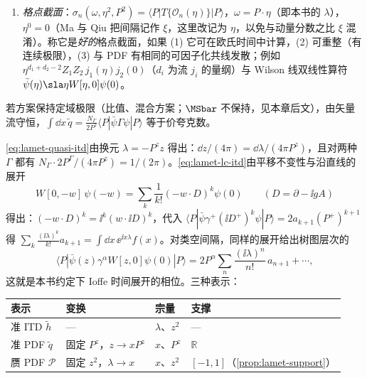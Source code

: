 \begin{definition}
\begin{enumerate}[label=(\roman*),leftmargin=2em,itemsep=1pt,topsep=2pt]
\begin{equation}\label{eq:lamet-lc-itd}
I(\lambda,\mu)=\frac{\langle P|\bar\psi(w)\gamma^+W[w,0]\psi(0)|P\rangle}{2P^+}=\int_{-1}^1\dd x\,\ee^{\ii x\lambda}f(x,\mu),
\end{equation}
其中 $w=(0^+,w^-,\mathbf 0_{\mathrm T})$，$\lambda=P^+w^-$。
\item \emph{格点截面}\cite{MaQiu2018}：$\sigma_n(\omega,\eta^2,P^2)=\langle P|T\{\mathcal O_n(\eta)\}|P\rangle$，$\omega=P\cdot\eta$（即本书的 $\lambda$），$\eta^0=0$（Ma 与 Qiu 把间隔记作 $\xi$，这里改记为 $\eta$，以免与动量分数之比 $\xi$ 混淆）。称它是\emph{好的}格点截面，如果 (1) 它可在欧氏时间中计算，(2) 可重整（有连续极限），(3) 与 PDF 有相同的可因子化共线发散；例如 $\eta^{d_1+d_2-2}Z_1Z_2\,j_1(\eta)j_2(0)$（$d_i$ 为流 $j_i$ 的量纲）与 Wilson 线双线性算符 $\bar\psi(\eta)\sla\eta W[\eta,0]\psi(0)$。
\end{enumerate}
若方案保持定域极限（比值、混合方案；$\MSbar$ 不保持，见本章后文），由矢量流守恒，$\int\dd x\,\tilde q=\frac{N_\Gamma}{2P^z}\langle P|\bar\psi\Gamma\psi|P\rangle$ 等于价夸克数。
\end{definition}

\cref{eq:lamet-quasi-itd}由换元 $\lambda=-P^zz$ 得出：$\dd z/(4\pi)=\dd\lambda/(4\pi P^z)$，且对两种 $\Gamma$ 都有 $N_\Gamma\cdot2P^\Gamma/(4\pi P^z)=1/(2\pi)$。\cref{eq:lamet-lc-itd}由平移不变性与沿直线的展开
\[
W[0,-w]\,\psi(-w)=\sum_k\frac1{k!}(-w\cdot D)^k\psi(0)\qquad(D=\partial-\ii gA)
\]
得出：$(-w\cdot D)^k=\ii^k(w\cdot\ii D)^k$，代入 $\langle P|\bar\psi\gamma^+(\ii D^+)^k\psi|P\rangle=2a_{k+1}(P^+)^{k+1}$ 得 $\sum_k\frac{(\ii\lambda)^k}{k!}a_{k+1}=\int\dd x\,\ee^{\ii x\lambda}f(x)$。对类空间隔，同样的展开给出树图层次的
\[
\langle P|\bar\psi(z)\gamma^\alpha W[z,0]\psi(0)|P\rangle=2P^\alpha\sum_n\frac{(\ii\lambda)^n}{n!}\,a_{n+1}+\cdots,
\]
这就是本书约定下 Ioffe 时间展开的相位。三种表示：
\begin{center}
\small
\begin{tabular}{@{}llll@{}}
\toprule
表示 & 变换 & 宗量 & 支撑 \\
\midrule
准 ITD $\tilde h$ & — & $\lambda$、$z^2$ & — \\
准 PDF $\tilde q$ & 固定 $P^z$，$z\to xP^z$ & $x$、$P^z$ & $\mathbb R$ \\
赝 PDF $\mathcal P$ & 固定 $z^2$，$\lambda\to x$ & $x$、$z^2$ & $[-1,1]$（\cref{prop:lamet-support}） \\
\bottomrule
\end{tabular}
\end{center}

